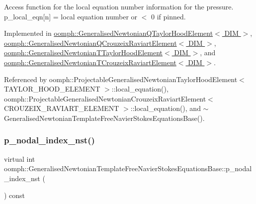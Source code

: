 Access function for the local equation number information for the pressure. p\+\_\+local\+\_\+eqn\mbox{[}n\mbox{]} = local equation number or $<$ 0 if pinned. 



Implemented in \hyperlink{classoomph_1_1GeneralisedNewtonianQTaylorHoodElement_aaf84cc52c787714cef5845f8750e469a}{oomph\+::\+Generalised\+Newtonian\+Q\+Taylor\+Hood\+Element$<$ D\+I\+M $>$}, \hyperlink{classoomph_1_1GeneralisedNewtonianQCrouzeixRaviartElement_ade39fac0866f29d4e87fefd567fc33f9}{oomph\+::\+Generalised\+Newtonian\+Q\+Crouzeix\+Raviart\+Element$<$ D\+I\+M $>$}, \hyperlink{classoomph_1_1GeneralisedNewtonianTTaylorHoodElement_a33beac305cc4372aec3bf180d3ac48da}{oomph\+::\+Generalised\+Newtonian\+T\+Taylor\+Hood\+Element$<$ D\+I\+M $>$}, and \hyperlink{classoomph_1_1GeneralisedNewtonianTCrouzeixRaviartElement_a8c03ca5840d0f0da302bea52518744d9}{oomph\+::\+Generalised\+Newtonian\+T\+Crouzeix\+Raviart\+Element$<$ D\+I\+M $>$}.



Referenced by oomph\+::\+Projectable\+Generalised\+Newtonian\+Taylor\+Hood\+Element$<$ T\+A\+Y\+L\+O\+R\+\_\+\+H\+O\+O\+D\+\_\+\+E\+L\+E\+M\+E\+N\+T $>$\+::local\+\_\+equation(), oomph\+::\+Projectable\+Generalised\+Newtonian\+Crouzeix\+Raviart\+Element$<$ C\+R\+O\+U\+Z\+E\+I\+X\+\_\+\+R\+A\+V\+I\+A\+R\+T\+\_\+\+E\+L\+E\+M\+E\+N\+T $>$\+::local\+\_\+equation(), and $\sim$\+Generalised\+Newtonian\+Template\+Free\+Navier\+Stokes\+Equations\+Base().

\mbox{\label{classoomph_1_1GeneralisedNewtonianTemplateFreeNavierStokesEquationsBase_a649186f26fbe7e3725a50c777a68008b}} 
\subsubsection{\texorpdfstring{p\+\_\+nodal\+\_\+index\+\_\+nst()}{p\_nodal\_index\_nst()}}
{\footnotesize\ttfamily virtual int oomph\+::\+Generalised\+Newtonian\+Template\+Free\+Navier\+Stokes\+Equations\+Base\+::p\+\_\+nodal\+\_\+index\+\_\+nst (\begin{DoxyParamCaption}{ }\end{DoxyParamCaption}) const\hspace{0.3cm}{\ttfamily [pure virtual]}}



